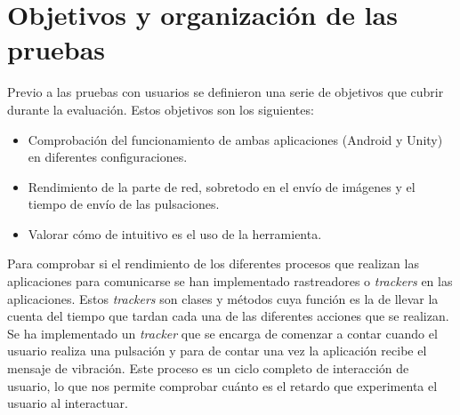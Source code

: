 \begin{figure}[!ht]
     \hfill
     \label{fig:quinta}
   \end{figure}


\section{Objetivos y organizaci\'on de las pruebas}

Previo a las pruebas con usuarios se definieron una serie de objetivos que cubrir durante la evaluaci\'on. Estos objetivos son los siguientes:

\begin {itemize}
\item Comprobaci\'on del funcionamiento de ambas aplicaciones (Android y Unity) en diferentes configuraciones.
\item Rendimiento de la parte de red, sobretodo en el env\'io de im\'agenes y el tiempo de env\'io de las pulsaciones.
\item Valorar c\'omo de intuitivo es el uso de la herramienta.
\end {itemize}

Para comprobar si el rendimiento de los diferentes procesos que realizan las aplicaciones para comunicarse se han implementado rastreadores o \textit{trackers} en las aplicaciones. Estos \textit{trackers} son clases y m\'etodos cuya funci\'on es la de llevar la cuenta del tiempo que tardan cada una de las diferentes acciones que se realizan. Se ha implementado un \textit{tracker} que se encarga de comenzar a contar cuando el usuario realiza una pulsaci\'on y para de contar una vez la aplicaci\'on recibe el mensaje de vibraci\'on. Este proceso es un ciclo completo de interacci\'on de usuario, lo que nos permite comprobar cu\'anto es el retardo que experimenta el usuario al interactuar.\\

